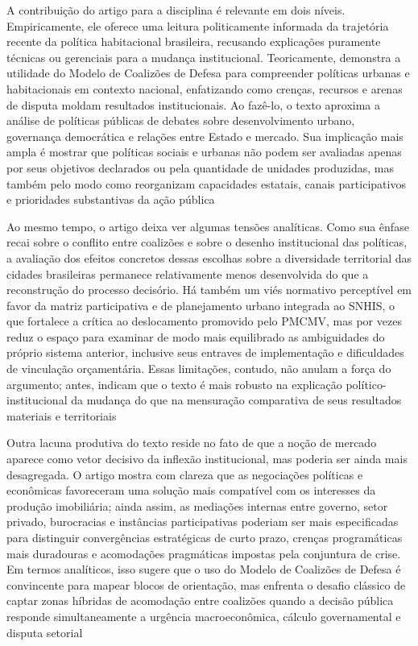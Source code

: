 \documentclass[12pt,a4paper]{article}
\begin{document}
A contribuição do artigo para a disciplina é relevante em dois níveis. Empiricamente, ele oferece uma leitura politicamente informada da trajetória recente da política habitacional brasileira, recusando explicações puramente técnicas ou gerenciais para a mudança institucional. Teoricamente, demonstra a utilidade do Modelo de Coalizões de Defesa para compreender políticas urbanas e habitacionais em contexto nacional, enfatizando como crenças, recursos e arenas de disputa moldam resultados institucionais. Ao fazê-lo, o texto aproxima a análise de políticas públicas de debates sobre desenvolvimento urbano, governança democrática e relações entre Estado e mercado. Sua implicação mais ampla é mostrar que políticas sociais e urbanas não podem ser avaliadas apenas por seus objetivos declarados ou pela quantidade de unidades produzidas, mas também pelo modo como reorganizam capacidades estatais, canais participativos e prioridades substantivas da ação pública\parencite{ferreira2019_politica_habitacional}

Ao mesmo tempo, o artigo deixa ver algumas tensões analíticas. Como sua ênfase recai sobre o conflito entre coalizões e sobre o desenho institucional das políticas, a avaliação dos efeitos concretos dessas escolhas sobre a diversidade territorial das cidades brasileiras permanece relativamente menos desenvolvida do que a reconstrução do processo decisório. Há também um viés normativo perceptível em favor da matriz participativa e de planejamento urbano integrada ao SNHIS, o que fortalece a crítica ao deslocamento promovido pelo PMCMV, mas por vezes reduz o espaço para examinar de modo mais equilibrado as ambiguidades do próprio sistema anterior, inclusive seus entraves de implementação e dificuldades de vinculação orçamentária. Essas limitações, contudo, não anulam a força do argumento; antes, indicam que o texto é mais robusto na explicação político-institucional da mudança do que na mensuração comparativa de seus resultados materiais e territoriais\parencite{ferreira2019_politica_habitacional}

Outra lacuna produtiva do texto reside no fato de que a noção de mercado aparece como vetor decisivo da inflexão institucional, mas poderia ser ainda mais desagregada. O artigo mostra com clareza que as negociações políticas e econômicas favoreceram uma solução mais compatível com os interesses da produção imobiliária; ainda assim, as mediações internas entre governo, setor privado, burocracias e instâncias participativas poderiam ser mais especificadas para distinguir convergências estratégicas de curto prazo, crenças programáticas mais duradouras e acomodações pragmáticas impostas pela conjuntura de crise. Em termos analíticos, isso sugere que o uso do Modelo de Coalizões de Defesa é convincente para mapear blocos de orientação, mas enfrenta o desafio clássico de captar zonas híbridas de acomodação entre coalizões quando a decisão pública responde simultaneamente a urgência macroeconômica, cálculo governamental e disputa setorial\parencite{ferreira2019_politica_habitacional}
\end{document}
